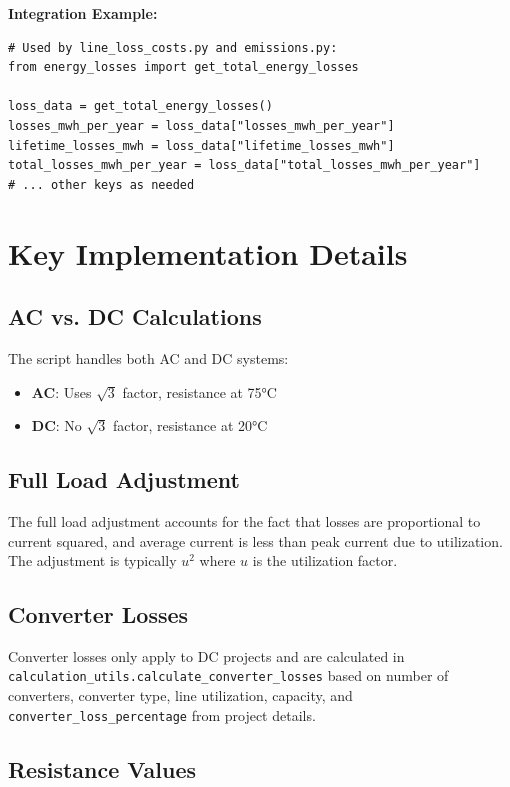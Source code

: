 \documentclass[ctcc_full_documentation.tex]{subfiles}
\begin{document}
\textbf{Integration Example:}

\begin{lstlisting}
# Used by line_loss_costs.py and emissions.py:
from energy_losses import get_total_energy_losses

loss_data = get_total_energy_losses()
losses_mwh_per_year = loss_data["losses_mwh_per_year"]
lifetime_losses_mwh = loss_data["lifetime_losses_mwh"]
total_losses_mwh_per_year = loss_data["total_losses_mwh_per_year"]
# ... other keys as needed
\end{lstlisting}

\section{Key Implementation Details}

\subsection{AC vs. DC Calculations}

The script handles both AC and DC systems:
\begin{itemize}
    \item \textbf{AC}: Uses $\sqrt{3}$ factor, resistance at 75°C
    \item \textbf{DC}: No $\sqrt{3}$ factor, resistance at 20°C
\end{itemize}

\subsection{Full Load Adjustment}

The full load adjustment accounts for the fact that losses are proportional to current squared, and average current is less than peak current due to utilization. The adjustment is typically $u^2$ where $u$ is the utilization factor.

\subsection{Converter Losses}

Converter losses only apply to DC projects and are calculated in \texttt{calculation\_utils.calculate\_converter\_losses} based on number of converters, converter type, line utilization, capacity, and \texttt{converter\_loss\_percentage} from project details.

\subsection{Resistance Values}
\end{document}
